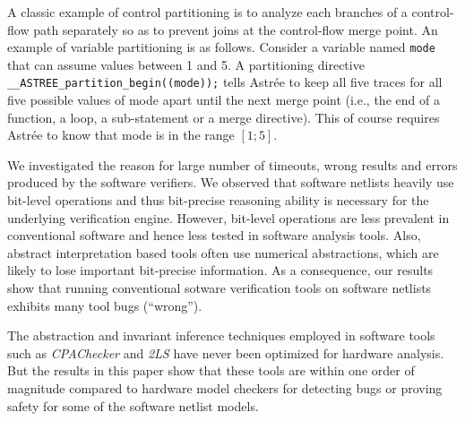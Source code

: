A classic example of control partitioning is to analyze each branches of a 
control-flow path separately so as to prevent joins at the control-flow merge 
point.  An example of variable partitioning is as follows. Consider a variable 
named \texttt{mode} that can assume values between 1 and 5.  A partitioning directive 
\texttt{\_\_ASTREE\_partition\_begin((mode));} tells Astr{\'e}e to keep all 
five traces for all five possible values of mode apart 
until the next merge point (i.e., the end of a function, a loop, a sub-statement 
or a merge directive). This of course requires Astr{\'e}e to know that mode is 
in the range $[1;5]$.








 We investigated the reason for large
number of timeouts, wrong results and errors produced by the software
verifiers.  We observed that software netlists heavily use bit-level 
operations and thus bit-precise reasoning ability is necessary for 
the underlying verification engine. However, bit-level operations 
are less prevalent in conventional software and hence less tested 
in software analysis tools. Also, abstract interpretation based tools 
often use numerical abstractions, which are likely to lose 
important bit-precise information.  As a consequence, 
our results show that running conventional sotware verification 
tools on software netlists exhibits many tool bugs (``wrong'').

The abstraction and invariant inference techniques employed in
software tools such as \emph{CPAChecker} and \emph{2LS} have never
been optimized for hardware analysis. But the results in this paper
show that these tools are within one order of magnitude compared to
hardware model checkers for detecting bugs or proving safety for some
of the software netlist models.  

